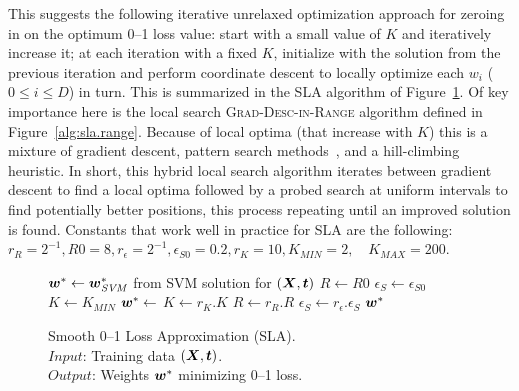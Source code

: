 This suggests the following iterative unrelaxed optimization approach
for zeroing in on the optimum 0--1 loss value: start with a small
value of $K$ and iteratively increase it; at each iteration with a
fixed $K$, initialize with the solution from the previous iteration
and perform coordinate descent to locally optimize each $w_i$ ($0 \leq
i \leq D$) in turn.  This is summarized in the SLA algorithm of
Figure~\ref{alg:sla.algorithm}.  Of key importance here is the local
search \textsc{Grad-Desc-in-Range} algorithm defined in
Figure~\ref{alg:sla.range}.  Because of local optima (that increase
with $K$) this is a mixture of gradient descent, pattern search
methods~\cite{Hooke}, and a hill-climbing heuristic.  In short, this
hybrid local search algorithm iterates between gradient descent to
find a local optima followed by a probed search at uniform intervals
to find potentially better positions, this process repeating until 
an improved solution is found.  Constants that work well in practice
for SLA are the following: $r_R = 2^{-1}, R0 = 8, r_\epsilon = 2^{-1}, 
\epsilon_{S0} = 0.2, r_K = 10, K_{MIN} = 2, \quad K_{MAX} = 200$.

\begin{figure}
\vspace{-3mm}
\caption{
Smooth 0--1 Loss Approximation (SLA). \\
\text{\hspace{1.4cm}} $Input$: Training data $(\boldsymbol{X},\boldsymbol{t})$. \\
\text{\hspace{1.4cm}} $Output$: Weights $\boldsymbol{w}^*$ minimizing 0--1 loss.
}
\label{alg:sla.algorithm}
{\footnotesize
\begin{algorithmic}[1]
 
   \State $\boldsymbol{w}^* \gets \boldsymbol{w}^*_{\mathit{SVM}}$ from SVM solution for $(\boldsymbol{X},\boldsymbol{t})$
   \State $R \gets R0$
   \State $\epsilon_S \gets \epsilon_{S0}$
   \State $K \gets K_{MIN}$
      \State $\boldsymbol{w}^* \gets$ 
      \State $K \gets r_K.K$
      \State $R \gets r_R.R$
      \State $\epsilon_S \gets r_\epsilon.\epsilon_S$
   \EndWhile
   \State \Return $\boldsymbol{w}^*$
\EndFunction
\end{algorithmic}}
\vspace{-4mm}
\end{figure}

